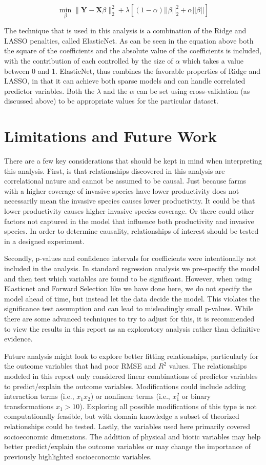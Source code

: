 \documentclass{article}
\newcommand{\bX}{\mathbf{X}}
\newcommand{\bY}{\mathbf{Y}}
\begin{document}
\[\min_{\beta}  \|\bY - \bX\beta\|_{2}^{2} + \lambda[(1 - \alpha)||\beta||_2^2 + \alpha||\beta||] \tag{ElasticNet}\]

The technique that is used in this analysis is a combination of the Ridge and LASSO penalties, called ElasticNet. As can be seen in the equation above both the square of the coefficients and the absolute value of the coefficients is included, with the contribution of each controlled by the size of $\alpha$ which takes a value between 0 and 1. ElasticNet, thus combines the favorable properties of Ridge and LASSO, in that it can achieve both sparse models and can handle correlated predictor variables. Both the $\lambda$ and the $\alpha$ can be set using cross-validation (as discussed above) to be appropriate values for the particular dataset. 

\section{Limitations and Future Work}
There are a few key considerations that should be kept in mind when interpreting this analysis. First, is that relationships discovered in this analysis are correlational nature and cannot be assumed to be causal. Just because farms with a higher coverage of invasive species have lower productivity does not necessarily mean the invasive species causes lower productivity. It could be that lower productivity causes higher invasive species coverage. Or there could other factors not captured in the model that influence both productivity and invasive species. In order to determine causality, relationships of interest should be tested in a designed experiment. 

Secondly, p-values and confidence intervals for coefficients were intentionally not included in the analysis. In standard 
regression analysis we pre-specify the model and then test which variables are found to be significant. However, when using 
Elasticnet and Forward Selection like we have done here, we do not specify the model ahead of time, but instead let the data 
decide the model. This violates the significance test assumption and can lead to misleadingly small p-values. While there are some advanced techniques to try to adjust for this, it is recommended to view the results in this report as an exploratory analysis rather than definitive evidence.

Future analysis might look to explore better fitting relationships, particularly for the outcome variables that had poor RMSE and $R^2$ values. The relationships modeled in this report only considered linear combinations of predictor variables to predict/explain the outcome variables. Modifications could include adding interaction terms (i.e., $x_1x_2$) or nonlinear terms (i.e., $x_1^2$ or binary transformations $x_1 > 10$). Exploring all possible modifications of this type is not computationally feasible, but with domain knowledge a subset of theorized relationships could be tested. Lastly, the variables used here primarily covered socioeconomic dimensions. The addition of physical and biotic variables may help better predict/explain the outcome variables or may change the importance of previously highlighted socioeconomic variables.
\end{document}
